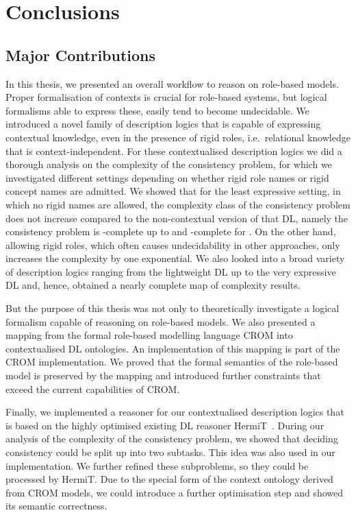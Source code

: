 \chapter{Conclusions}
\label{cha:conclusions}


\section{Major Contributions}
\label{sec:major-contributions}

In this thesis, we presented an overall workflow to reason on role-based models. Proper
formalisation of contexts is crucial for role-based systems, but logical formalisms able to express
these, easily tend to become undecidable.  We introduced a novel family of description logics that
is capable of expressing contextual knowledge, even in the presence of rigid roles, i.e.\ relational
knowledge that is context-independent.  For these contextualised description logics we did a
thorough analysis on the complexity of the consistency problem, for which we investigated different
settings depending on whether rigid role names or rigid concept names are admitted. We showed that
for the least expressive setting, in which no rigid names are allowed, the complexity class of the
consistency problem does not increase compared to the non-contextual version of that DL, namely the
consistency problem is \ExpTime-complete up to \SHOQSHOQ and \NExpTime-complete for \SHOIQSHOIQ. On
the other hand, allowing rigid roles, which often causes undecidability in other approaches, only
increases the complexity by one exponential.
%
We also looked into a broad variety of description logics
ranging from the lightweight DL \EL up to the very expressive DL \SHOIQ and, hence, obtained a
nearly complete map of complexity results.

But the purpose of this thesis was not only to theoretically investigate a logical formalism capable
of reasoning on role-based models. We also presented a mapping from the formal role-based modelling
language CROM into contextualised DL ontologies. An implementation of this mapping is part of the CROM
implementation. We proved that the formal semantics of the role-based model is preserved
by the mapping and introduced further constraints that exceed the current capabilities of CROM.

Finally, we implemented a reasoner for our contextualised description logics that is based on the highly
optimised existing DL reasoner HermiT~\cite{GHM-JAR14}.  During our analysis of the complexity of
the consistency problem, we showed that deciding consistency could be split up into two
subtasks. This idea was also used in our implementation.  We further refined these subproblems, so
they could be processed by HermiT.  Due to the special form of the context ontology derived from
CROM models, we could introduce a further optimisation step and showed its semantic correctness.




